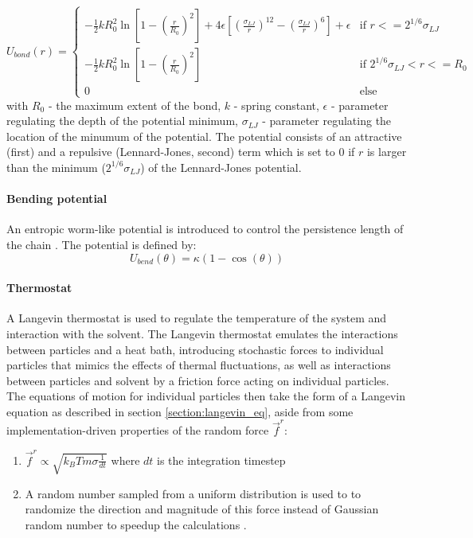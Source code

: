 \documentclass[
    paper=A4,pagesize=automedia,fontsize=12pt,
    BCOR=15mm,DIV=22,
    twoside,headinclude,footinclude=false,
    fleqn,             %
    bibliography=totocnumbered,          %
    listof=totoc,                %
    listof=flat,                 %
    cleardoublepage=empty      %
    numbers=endperiod
]{scrartcl}
\begin{document}
\begin{equation}
    U_{bond}(r) = 
    \begin{cases}
        -\frac{1}{2} k R_0^2 \ln\left[1 - \left(\frac{r}{R_0}\right)^2\right] + 4 \epsilon \left[\left(\frac{\sigma_{LJ}}{r}\right)^{12} - \left(\frac{\sigma_{LJ}}{r}\right)^6\right] + \epsilon & \text{if } r <= 2^{1/6} \sigma_{LJ} \\
        -\frac{1}{2} k R_0^2 \ln\left[1 - \left(\frac{r}{R_0}\right)^2\right] & \text{if } 2^{1/6}\sigma_{LJ} < r <= R_0\\
        0 & \text{else}
    \end{cases}
\end{equation}
with $R_0$ - the maximum extent of the bond, $k$ - spring constant, $\epsilon$ - parameter regulating
the depth of the potential minimum, $\sigma_{LJ}$ - parameter regulating the location of the minumum
of the potential. The potential consists of an attractive (first) and 
a repulsive (Lennard-Jones, second) term which is 
set to $0$ if $r$ is larger than
the minimum ($2^{1/6}\sigma_{LJ}$) of the Lennard-Jones potential.

\paragraph{Bending potential}
\label{par:bend_potential}
An entropic worm-like potential \cite{svaneborg_2020} is introduced to control the persistence length of the chain \cite{svaneborg_2020}.
The potential is defined by:
\begin{equation} \label{eq:angle_potential}
    U_{bend}(\theta) = \kappa (1 - \cos(\theta))
\end{equation}

\paragraph{Thermostat}
A Langevin thermostat is used to regulate the temperature of the system and interaction with the solvent.
The Langevin thermostat emulates the interactions between particles and a heat bath, 
introducing stochastic forces to individual particles that mimics the effects of thermal fluctuations,
as well as interactions between particles and solvent by a friction force acting on individual particles.
The equations of motion for individual particles then take the form of a Langevin equation as described
in section \ref{section:langevin_eq}, aside from some implementation-driven properties of the random force $\vec{f}^r$:
\begin{enumerate}
    \item $\vec{f}^r \propto \sqrt{k_B T m \sigma \frac{1}{dt}}$ where $dt$ is the integration timestep \cite{LAMMPS}
    \item A random number sampled from a uniform distribution is used to to randomize the direction 
    and magnitude of this force instead of Gaussian random number to speedup the
    calculations \cite{LAMMPS} \cite{dunweg}.
\end{enumerate}
\end{document}
